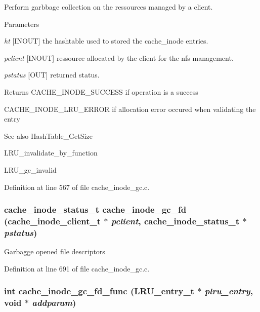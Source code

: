 Perform garbbage collection on the ressources managed by a client.


\begin{DoxyParams}{Parameters}
\item[{\em ht}][INOUT] the hashtable used to stored the cache\_\-inode entries. \item[{\em pclient}][INOUT] ressource allocated by the client for the nfs management. \item[{\em pstatus}][OUT] returned status.\end{DoxyParams}
\begin{DoxyReturn}{Returns}
CACHE\_\-INODE\_\-SUCCESS if operation is a success \par
 

CACHE\_\-INODE\_\-LRU\_\-ERROR if allocation error occured when validating the entry
\end{DoxyReturn}
\begin{DoxySeeAlso}{See also}
HashTable\_\-GetSize 

LRU\_\-invalidate\_\-by\_\-function 

LRU\_\-gc\_\-invalid 
\end{DoxySeeAlso}


Definition at line 567 of file cache\_\-inode\_\-gc.c.
\subsubsection[{cache\_\-inode\_\-gc\_\-fd}]{\setlength{\rightskip}{0pt plus 5cm}cache\_\-inode\_\-status\_\-t cache\_\-inode\_\-gc\_\-fd (cache\_\-inode\_\-client\_\-t $\ast$ {\em pclient}, \/  cache\_\-inode\_\-status\_\-t $\ast$ {\em pstatus})}\label{group__Cache__inode__gc__interface_ga44c4a77761d87309e6230c59a8f7a656}
Garbagge opened file descriptors 

Definition at line 691 of file cache\_\-inode\_\-gc.c.
\subsubsection[{cache\_\-inode\_\-gc\_\-fd\_\-func}]{\setlength{\rightskip}{0pt plus 5cm}int cache\_\-inode\_\-gc\_\-fd\_\-func (LRU\_\-entry\_\-t $\ast$ {\em plru\_\-entry}, \/  void $\ast$ {\em addparam})}\label{group__Cache__inode__gc__interface_ga04db13ebf2c5e871dda72102bf922d3f}


